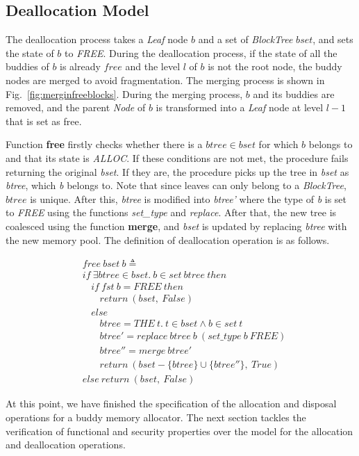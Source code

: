\subsection{Deallocation Model}
The deallocation process takes a \emph{Leaf} node $b$ and a set of \emph{BlockTree} $bset$, and sets the state of $b$ to \emph{FREE}. During the deallocation process, if the state of all the buddies of $b$ is already $free$ and the level $l$ of $b$ is not the root node, the buddy nodes are merged to avoid fragmentation. The merging process is shown in Fig.~\ref{fig:merginfreeblocks}. During the merging process, $b$ and its buddies are removed, and the parent \emph{Node} of $b$ is transformed into a \emph{Leaf} node at level $l - 1$ that is set as free.

Function \textbf{free} firstly checks whether there is a $btree \in bset$ for which $b$ belongs to and that its state is \emph{ALLOC}. If these conditions are not met, the procedure fails returning the original \emph{bset}. If they are, the procedure picks up the tree in \emph{bset} as \emph{btree}, which \emph{b} belongs to. Note that since leaves can only belong to a \emph{BlockTree}, $btree$ is unique. After this, \emph{btree} is modified into \emph{btree'} where the type of \emph{b} is set to \emph{FREE} using the functions \emph{set\_type} and \emph{replace}. After that, the new tree is coalesced using the function \textbf{merge}, and \emph{bset} is updated by replacing \emph{btree} with the new memory pool. The definition of deallocation operation is as follows.

\begin{definition} 
	\begin{align*}
	&free\ bset\ b \triangleq \\
	&if\ \exists btree \in bset.\ b \in set\ btree\ then \\
	&\ \ \ \ if\ fst\ b = FREE\ then \\
	&\ \ \ \ \ \ \ \ return\ (bset,\ False) \\
	&\ \ \ \ else \\
	&\ \ \ \ \ \ \ \ btree = THE\ t.\ t \in bset \wedge b \in set\ t \\
	&\ \ \ \ \ \ \ \ btree' = replace\ btree\ b\ (set\_type\ b\ FREE) \\
	&\ \ \ \ \ \ \ \ btree'' = merge\ btree' \\
	&\ \ \ \ \ \ \ \ return\ (bset - \lbrace btree \rbrace \cup \lbrace btree'' \rbrace,\ True) \\
	&else\ return\ (bset,\ False)
	\end{align*}
\end{definition}

At this point, we have finished the specification of the allocation and disposal operations for a buddy memory allocator. The next section tackles the verification of functional and security properties over the model for the allocation and deallocation operations.